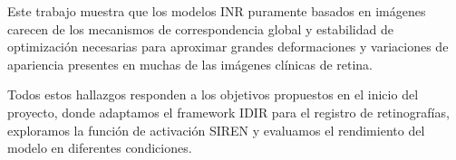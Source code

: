 Este trabajo muestra que los modelos \gls{INR} puramente basados en imágenes carecen de los mecanismos de correspondencia global y estabilidad de optimización necesarias para aproximar grandes deformaciones y variaciones de apariencia presentes en muchas de las imágenes clínicas de retina.

Todos estos hallazgos responden a los objetivos propuestos en el inicio del proyecto, donde adaptamos el framework IDIR para el registro de retinografías, exploramos la función de activación SIREN y evaluamos el rendimiento del modelo en diferentes condiciones.